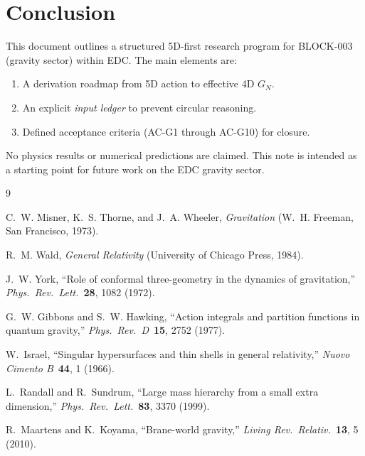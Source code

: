 \documentclass[11pt,a4paper]{article}
\begin{document}
\section{Conclusion}
\label{sec:conclusion}

This document outlines a structured 5D-first research program for BLOCK-003 (gravity sector) within EDC.
The main elements are:
\begin{enumerate}[nosep]
    \item A derivation roadmap from 5D action to effective 4D $G_N$.
    \item An explicit \emph{input ledger} to prevent circular reasoning.
    \item Defined acceptance criteria (AC-G1 through AC-G10) for closure.
\end{enumerate}

No physics results or numerical predictions are claimed.
This note is intended as a starting point for future work on the EDC gravity sector.


\begin{thebibliography}{9}

C.~W. Misner, K.~S. Thorne, and J.~A. Wheeler,
\textit{Gravitation} (W.~H. Freeman, San Francisco, 1973).

R.~M. Wald,
\textit{General Relativity} (University of Chicago Press, 1984).

J.~W. York,
``Role of conformal three-geometry in the dynamics of gravitation,''
\textit{Phys.\ Rev.\ Lett.}\ \textbf{28}, 1082 (1972).

G.~W. Gibbons and S.~W. Hawking,
``Action integrals and partition functions in quantum gravity,''
\textit{Phys.\ Rev.\ D}\ \textbf{15}, 2752 (1977).

W.~Israel,
``Singular hypersurfaces and thin shells in general relativity,''
\textit{Nuovo Cimento B}\ \textbf{44}, 1 (1966).

L.~Randall and R.~Sundrum,
``Large mass hierarchy from a small extra dimension,''
\textit{Phys.\ Rev.\ Lett.}\ \textbf{83}, 3370 (1999).

R.~Maartens and K.~Koyama,
``Brane-world gravity,''
\textit{Living Rev.\ Relativ.}\ \textbf{13}, 5 (2010).

\end{thebibliography}
\end{document}
